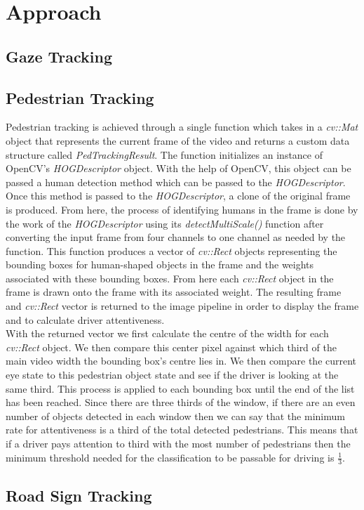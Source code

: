 \section{Approach}

\subsection{Gaze Tracking}


\subsection{Pedestrian Tracking}
Pedestrian tracking is achieved through a single function which takes in a \emph{cv::Mat} object that represents the current frame of the video and returns a custom data structure called \emph{PedTrackingResult}. The function initializes an instance of OpenCV's \emph{HOGDescriptor} object. With the help of OpenCV, this object can be passed a human detection method which can be passed to the \emph{HOGDescriptor}. Once this method is passed to the \emph{HOGDescriptor}, a clone of the original frame is produced. From here, the process of identifying humans in the frame is done by the work of the \emph{HOGDescriptor} using its \emph{detectMultiScale()} function after converting the input frame from four channels to one channel as needed by the function. This function produces a vector of \emph{cv::Rect} objects representing the bounding boxes for human-shaped objects in the frame and the weights associated with these bounding boxes. From here each \emph{cv::Rect} object in the frame is drawn onto the frame with its associated weight. The resulting frame and \emph{cv::Rect} vector is returned to the image pipeline in order to display the frame and to calculate driver attentiveness.\\

With the returned vector we first calculate the centre of the width for each \emph{cv::Rect} object. We then compare this center pixel against which third of the main video width the bounding box's centre lies in. We then compare the current eye state to this pedestrian object state and see if the driver is looking at the same third. This process is applied to each bounding box until the end of the list has been reached. Since there are three thirds of the window, if there are an even number of objects detected in each window then we can say that the minimum rate for attentiveness is a third of the total detected pedestrians. This means that if a driver pays attention to third with the most number of pedestrians then the minimum threshold needed for the classification to be passable for driving is $\frac{1}{3}$.

\subsection{Road Sign Tracking}

